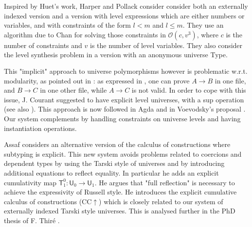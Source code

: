 \documentclass[11pt,a4paper]{article}
\theoremstyle{definition}
\def\UU{\mathsf{U}}
\newcommand{\T}{\mathsf{T}}
\def\Ordo{\mathcal{O}}
\begin{document}
Inspired by Huet's work, Harper and Pollack
\cite{HarperP91} consider consider both an externally indexed version and a version
with level expressions which are either numbers or variables, and with constraints of the form $l < m$ and $l \leq m$. They use an algorithm due to Chan
for solving those constraints in $\Ordo(c,v^3)$, where $c$ is the number of constraints and $v$ is the number of level variables. They also consider the level synthesis problem in a version with an anonymous universe Type.

This "implicit"
approach to universe polymorphisms however is problematic w.r.t. modularity, as pointed
out in \cite{Courant02}: as expressed in \cite{Simpson04},
one can prove $A\rightarrow B$ in one file, and $B\rightarrow C$ in one other file, while
$A\rightarrow C$ is not valid. In order to cope with this issue, J. Courant \cite{Courant02}
suggested to have explicit level universes, with a sup operation (see also \cite{herbelin05}).
This approach is now followed in Agda and in Voevodsky's proposal \cite{VV}. Our system complements
\cite{Courant02,VV} by handling constraints on universe levels and having instantiation operations.


Assaf \cite{Assaf14} considers an alternative version of the calculus of
constructions where subtyping is explicit. This new system avoids problems related to coercions and dependent types by using the Tarski style
of universes and by introducing additional equations to reflect equality. In particular he adds an explicit cumulativity map $\T^0_1 : \UU_0 \to \UU_1$. He argues that "full reflection" is necessary to achieve the expressivity of Russell style. He introduces the explicit cumulative calculus of constructions (CC$\uparrow$) which is closely related to our system of externally indexed Tarski style universes.
This is analysed further in the PhD thesis of F. Thir\'e \cite{Thire20}.
\end{document}
